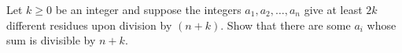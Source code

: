Let $k\ge 0$ be an integer and suppose the integers $a_1,a_2,\dots,a_n$ give at least $2k$ different residues upon division by $(n+k)$. Show that there are some $a_i$ whose sum is divisible by $n+k$.